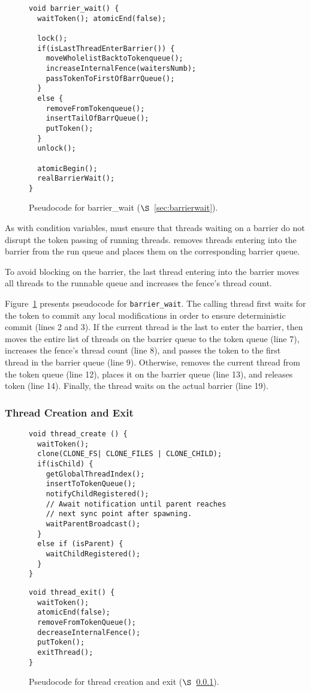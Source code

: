 \label{sec:barrierwait}

\begin{figure}
\begin{lstlisting}
void barrier_wait() {
  waitToken(); atomicEnd(false);
 
  lock();
  if(isLastThreadEnterBarrier()) {
	moveWholelistBacktoTokenqueue();
	increaseInternalFence(waitersNumb);
	passTokenToFirstOfBarrQueue();
  } 
  else {
    removeFromTokenqueue();
	insertTailOfBarrQueue();
	putToken();
  }
  unlock();

  atomicBegin();
  realBarrierWait();  
}
\end{lstlisting}
\caption{Pseudocode for barrier\_wait ($\S$~\ref{sec:barrierwait}).
\label{fig:barrierwait}}
\end{figure}

As with condition variables, \dthreads{} must ensure that threads
waiting on a barrier do not disrupt the token passing of running
threads. \dthreads{} removes threads entering into the barrier from
the run queue and places them on the corresponding barrier queue.

To avoid blocking on the barrier, the last thread entering into
the barrier moves all threads to the runnable queue and increases
the fence's thread count.

Figure~\ref{fig:barrierwait} presents pseudocode
for \texttt{barrier\_wait}. The calling thread first waits for the
token to commit any local modifications in order to ensure
deterministic commit (lines 2 and 3). If the current thread is the
last to enter the barrier, then \dthreads{} moves the entire list of
threads on the barrier queue to the token queue (line 7), increases
the fence's thread count (line 8), and passes the token to the first thread in the
barrier queue (line 9).  Otherwise, \dthreads{} removes the current
thread from the token queue (line 12), places it on the barrier queue
(line 13), and releases token (line 14). Finally, the thread waits on
the actual barrier (line 19).

\subsubsection{Thread Creation and Exit}

\label{sec:threadcreation}

\begin{figure}
\begin{lstlisting}
void thread_create () {
  waitToken();
  clone(CLONE_FS| CLONE_FILES | CLONE_CHILD);
  if(isChild) {
    getGlobalThreadIndex();
	insertToTokenQueue();
	notifyChildRegistered();
	// Await notification until parent reaches 
    // next sync point after spawning.
	waitParentBroadcast();	
  }
  else if (isParent) {
	waitChildRegistered();
  }
}
\end{lstlisting}
\begin{lstlisting}
void thread_exit() {
  waitToken();
  atomicEnd(false);
  removeFromTokenQueue();
  decreaseInternalFence();
  putToken();
  exitThread(); 
}
\end{lstlisting}
\caption{Pseudocode for thread creation and exit ($\S$~\ref{sec:threadcreation}).
\label{fig:threadcreation}
}
\end{figure}


